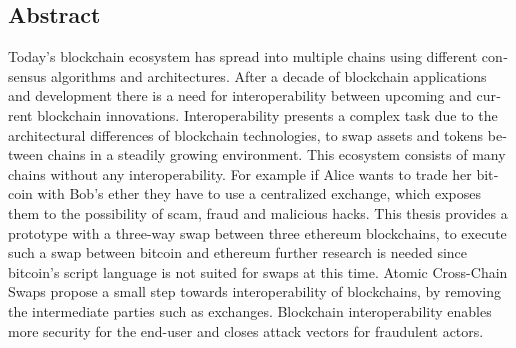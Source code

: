 

\begin{otherlanguage}{american}
	\chapter*{Abstract}
	Today’s blockchain ecosystem has spread into multiple chains using different consensus algorithms and architectures. After a decade of blockchain applications and development there is a need for interoperability between upcoming and current blockchain innovations. Interoperability presents a complex task due to the architectural differences of blockchain technologies, to swap assets and tokens between chains in a steadily growing environment. This ecosystem consists of many chains without any interoperability. For example if Alice wants to trade her bitcoin with Bob's ether they have to use a centralized exchange, which exposes them to the possibility of scam, fraud and malicious hacks. This thesis provides a prototype with a three-way swap between three ethereum blockchains, to execute such a swap between bitcoin and ethereum further research is needed since bitcoin's script language is not suited for swaps at this time. Atomic Cross-Chain Swaps propose a small step towards interoperability of blockchains, by removing the intermediate parties such as exchanges. Blockchain interoperability enables more security for the end-user and closes attack vectors for fraudulent actors.
	
	
	
	
	
\end{otherlanguage}
